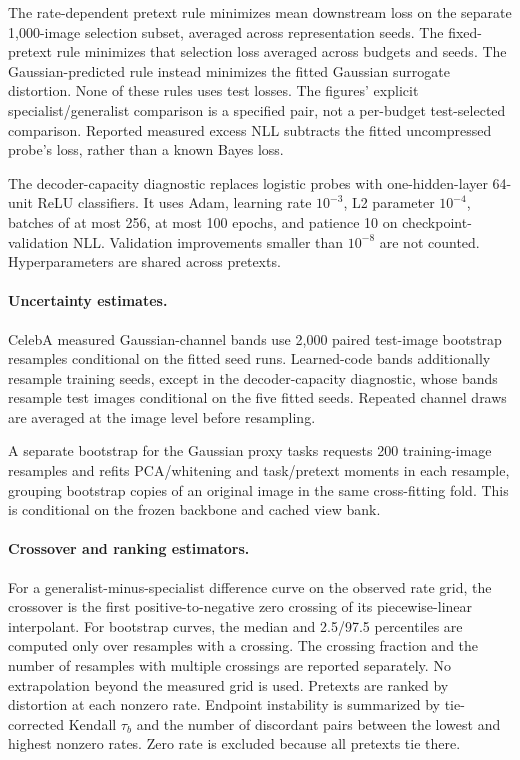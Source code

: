 The rate-dependent pretext rule minimizes mean downstream loss on the
separate 1,000-image selection subset, averaged across representation seeds.
The fixed-pretext rule minimizes that selection loss averaged across budgets
and seeds. The Gaussian-predicted rule instead minimizes the fitted Gaussian
surrogate distortion. None of these rules uses test losses. The figures'
explicit specialist/generalist comparison is a specified pair, not a
per-budget test-selected comparison. Reported measured excess NLL subtracts
the fitted uncompressed probe's loss, rather than a known Bayes loss.

The decoder-capacity diagnostic replaces logistic probes with one-hidden-layer
64-unit ReLU classifiers. It uses Adam, learning rate $10^{-3}$, L2 parameter
$10^{-4}$, batches of at most 256, at most 100 epochs, and patience 10 on
checkpoint-validation NLL. Validation improvements smaller than $10^{-8}$
are not counted. Hyperparameters are shared across pretexts.

\paragraph{Uncertainty estimates.}
CelebA measured Gaussian-channel bands use 2,000 paired test-image bootstrap
resamples conditional on the fitted seed runs. Learned-code bands additionally
resample training seeds, except in the decoder-capacity diagnostic, whose
bands resample test images conditional on the five fitted seeds.
Repeated channel draws are averaged at the image level before resampling.

A separate bootstrap for the Gaussian proxy tasks requests 200 training-image
resamples and refits PCA/whitening and task/pretext moments in each resample,
grouping bootstrap copies of an original image in the same cross-fitting fold.
This is conditional on the frozen backbone and cached view bank.

\paragraph{Crossover and ranking estimators.}
For a generalist-minus-specialist difference curve on the observed rate grid,
the crossover is the first positive-to-negative zero crossing of its
piecewise-linear interpolant. For bootstrap curves, the median and
2.5/97.5 percentiles are computed only over resamples with a crossing.
The crossing fraction and the number of resamples with multiple crossings
are reported separately. No extrapolation beyond the measured grid is used.
Pretexts are ranked by distortion at each nonzero rate. Endpoint instability
is summarized by tie-corrected Kendall $\tau_b$ and the number of discordant
pairs between the lowest and highest nonzero rates. Zero rate is excluded
because all pretexts tie there.

